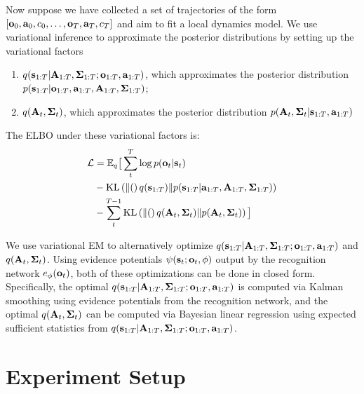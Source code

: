 Now suppose we have collected a set of trajectories of the form $\left[\mathbf{o}_0,\mathbf{a}_0,c_0,\ldots,\mathbf{o}_{T},\mathbf{a}_{T},c_{T}\right]$ and aim to fit a local dynamics model. We use variational inference to approximate the posterior distributions by setting up the variational factors
\vspace{-.5em}
\begin{enumerate}
    \itemsep0em
    \item $q(\mathbf{s}_{1:T} | \mathbf{A}_{1:T}, \bm{\Sigma}_{1:T}; \mathbf{o}_{1:T}, \mathbf{a}_{1:T})$, which approximates the posterior distribution $p(\mathbf{s}_{1:T} | \mathbf{o}_{1:T}, \mathbf{a}_{1:T}, \mathbf{A}_{1:T}, \bm{\Sigma}_{1:T})$;
    \item $q(\mathbf{A}_t, \bm{\Sigma}_t)$, which approximates the posterior distribution $p(\mathbf{A}_t, \bm{\Sigma}_t | \mathbf{s}_{1:T}, \mathbf{a}_{1:T})$
\end{enumerate}
\vspace{-.5em}
The ELBO under these variational factors is:
\begin{align*}
    \mathcal{L} &= \mathbb{E}_q \big[\sum_t^T \log p(\mathbf{o}_t | \mathbf{s}_t)\\ &- \mathrm{KL}\left(\left\|(\right)q(\mathbf{s}_{1:T})\|p(\mathbf{s}_{1:T} | \mathbf{a}_{1:T}, \mathbf{A}_{1:T}, \bm{\Sigma}_{1:T})\right)\\
    &- \sum_t^{T - 1} \mathrm{KL}\left(\left\|(\right)q(\mathbf{A}_t, \bm{\Sigma}_t)\|p(\mathbf{A}_t, \bm{\Sigma}_t)\right)
    \big]
\end{align*}

We use variational EM to alternatively optimize $q(\mathbf{s}_{1:T} | \mathbf{A}_{1:T}, \bm{\Sigma}_{1:T}; \mathbf{o}_{1:T}, \mathbf{a}_{1:T})$ and $q(\mathbf{A}_t, \bm{\Sigma}_t)$. Using evidence potentials $\psi(\mathbf{s}_t;\mathbf{o}_t,\phi)$ output by the recognition network $e_\phi(\mathbf{o}_t)$, both of these optimizations can be done in closed form. Specifically, the optimal $q(\mathbf{s}_{1:T} | \mathbf{A}_{1:T}, \bm{\Sigma}_{1:T}; \mathbf{o}_{1:T}, \mathbf{a}_{1:T})$ is computed via Kalman smoothing using evidence potentials from the recognition network, and the optimal $q(\mathbf{A}_t, \bm{\Sigma}_t)$ can be computed via Bayesian linear regression using expected sufficient statistics from $q(\mathbf{s}_{1:T} | \mathbf{A}_{1:T}, \bm{\Sigma}_{1:T}; \mathbf{o}_{1:T}, \mathbf{a}_{1:T})$.


\section{Experiment Setup}
\label{sec:supp-set}

